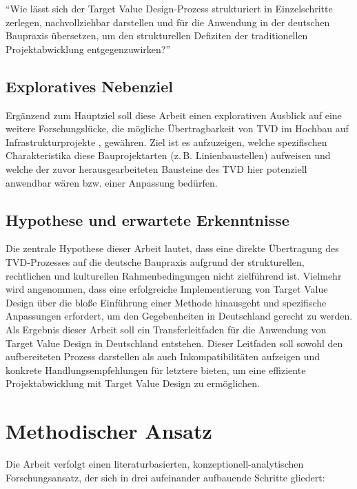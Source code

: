 \enquote{Wie lässt sich der Target Value Design-Prozess strukturiert in Einzelschritte zerlegen, nachvollziehbar darstellen und für die Anwendung in der deutschen Baupraxis übersetzen, um den strukturellen Defiziten der traditionellen Projektabwicklung entgegenzuwirken?}

\subsection*{Exploratives Nebenziel}
Ergänzend zum Hauptziel soll diese Arbeit einen explorativen Ausblick auf eine weitere Forschungslücke, die mögliche Übertragbarkeit von TVD im Hochbau auf Infrastrukturprojekte \autocite [Vgl.][S.45]{ballard2025}, gewähren. Ziel ist es aufzuzeigen, welche spezifischen Charakteristika diese Bauprojektarten (z.\,B. Linienbaustellen) aufweisen und welche der zuvor herausgearbeiteten Bausteine des TVD hier potenziell anwendbar wären bzw. einer Anpassung bedürfen.

\subsection*{Hypothese und erwartete Erkenntnisse}
Die zentrale Hypothese dieser Arbeit lautet, dass eine direkte Übertragung des TVD-Prozesses auf die deutsche Baupraxis aufgrund der strukturellen, rechtlichen und kulturellen Rahmenbedingungen nicht zielführend ist. Vielmehr wird angenommen, dass eine erfolgreiche Implementierung von Target Value Design über die bloße Einführung einer Methode hinausgeht und spezifische Anpassungen erfordert, um den Gegebenheiten in Deutschland gerecht zu werden.
Als Ergebnis dieser Arbeit soll ein Transferleitfaden für die Anwendung von Target Value Design in Deutschland entstehen. Dieser Leitfaden soll sowohl den aufbereiteten Prozess darstellen als auch Inkompatibilitäten aufzeigen und konkrete Handlungsempfehlungen für letztere bieten, um eine effiziente Projektabwicklung mit Target Value Design zu ermöglichen.

\section*{Methodischer Ansatz}
\label{sec:methodischer-ansatz}

Die Arbeit verfolgt einen literaturbasierten, konzeptionell-analytischen Forschungsansatz, der sich in drei aufeinander aufbauende Schritte gliedert:

